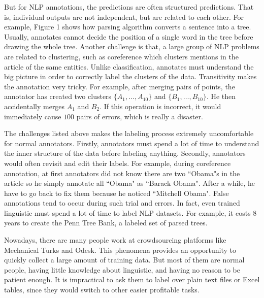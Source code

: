 But for NLP annotations, the predictions are often structured predictions. That is, individual outputs are not independent, but are related to each other. For example, Figure 1 shows how parsing algorithm converts a sentence into a tree. Usually, annotates cannot decide the position of a single word in the tree before drawing the whole tree.  Another challenge is that, a large group of NLP problems are related to clustering, such as coreference which clusters mentions in the article of the same entities. Unlike classification, annotates must understand the big picture in order to correctly label the clusters of the data. Transitivity makes the annotation very tricky. For example, after merging pairs of points, the annotator has created two clusters $\{A_1,\ldots,A_{10}\}$ and $\{B_1,\ldots,B_{10}\}$. He then accidentally merges $A_1$ and $B_2$. If this operation is incorrect, it would immediately cause $100$ pairs of errors, which is really a disaster. 


The challenges listed above makes the labeling process extremely uncomfortable for normal annotators. Firstly, annotators must spend a lot of time to understand the inner structure of the data before labeling anything. Secondly, annotators would often revisit and edit their labels. For example, during coreference annotation, at first annotators did not know there are two ``Obama"s in the article so he simply annotate all ``Obama" as ``Barack Obama". After a while, he have to go back to fix them because he noticed ``Mitchell Obama". False annotations tend to occur during such trial and errors. In fact, even trained linguistic must spend a lot of time to label NLP datasets. For example, it costs 8 years to create the Penn Tree Bank, a labeled set of parsed trees. 

Nowadays, there are many people work at crowdsourcing platforms like Mechanical Turks and Odesk. This phenomena provides an opportunity to quickly collect a large amount of training data. But most of them are normal people, having little knowledge about linguistic, and having no reason to be patient enough. It is impractical to ask them to label over plain text files or Excel tables, since they would switch to other easier profitable tasks.